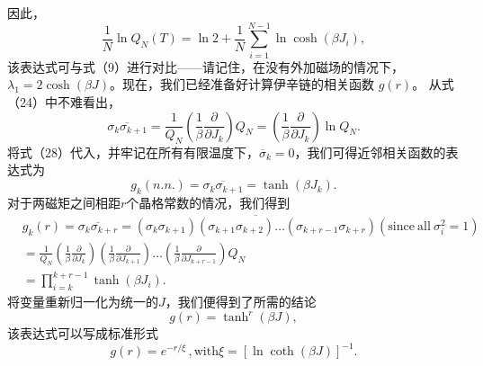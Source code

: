 因此，
\begin{equation}\tag{13.1.42}\label{eq:13.1.42}
\frac { 1 } { N } \ln Q _ { N } ( T ) = \ln 2 + \frac { 1 } { N } \sum _ { i = 1 } ^{N - 1} \ln \cosh ( \beta J _ { i } ) ,
\end{equation}
该表达式可与式（9）进行对比——请记住，在没有外加磁场的情况下，\(\lambda_{1}=2\cosh(\beta J)\)。现在，我们已经准备好计算伊辛链的相关函数 \(g(r)\)。
从式（24）中不难看出，
\begin{equation}\tag{13.1.43}\label{eq:13.1.43}
\overline { { \sigma _ { k } \sigma _ { k + 1 } } } = \frac { 1 } { Q _ { N } } \left( \frac { 1 } { \beta } \frac { \partial } { \partial J _ { k } } \right) Q _ { N } = \left( \frac { 1 } { \beta } \frac { \partial } { \partial J _ { k } } \right) \ln Q _ { N } .
\end{equation}
将式（28）代入，并牢记在所有有限温度下，\(\overline{\sigma}_{k}=0\)，我们可得近邻相关函数的表达式为
\begin{equation}\tag{13.1.44}\label{eq:13.1.44}
g _ { k } ( n . n . ) = \overline { { \sigma _ { k } \sigma _ { k + 1 } } } = \operatorname { t a n h } ( \beta J _ { k } ) .
\end{equation}
对于两磁矩之间相距\(r\)个晶格常数的情况，我们得到
\begin{equation}\tag{13.1.45}\label{eq:13.1.45}
\begin{array}{rl} & { g _ { k } ( r ) = \overline { { \sigma _ { k } \sigma _ { k + r } } } = \overline { { ( \sigma _ { k } \sigma _ { k + 1 } ) ( \sigma _ { k + 1 } \sigma _ { k + 2 } ) \dots ( \sigma _ { k + r - 1 } \sigma _ { k + r } ) } }  ( \mathrm { s i n c e ~ a l l ~ } \sigma _ { i } ^{2} = 1 ) } \\& {  = \frac { 1 } { Q _ { N } } \left( \frac { 1 } { \beta } \frac { \partial } { \partial J _ { k } } \right) \left( \frac { 1 } { \beta } \frac { \partial } { \partial J _ { k + 1 } } \right) \dots \left( \frac { 1 } { \beta } \frac { \partial } { \partial J _ { k + r - 1 } } \right) Q _ { N } } \\& {  = \prod _ { i = k } ^{k + r - 1} \operatorname { t a n h } ( \beta J _ { i } ) . } \end{array}
\end{equation}
将变量重新归一化为统一的\(J\)，我们便得到了所需的结论
\begin{equation}\tag{13.1.46}\label{eq:13.1.46}
g ( r ) = \operatorname { t a n h } ^{r} ( \beta J ) ,
\end{equation}
该表达式可以写成标准形式
\begin{equation}\tag{13.1.47}\label{eq:13.1.47}
g ( r ) = e ^{- r / \xi} \, ,  \mathrm { w i t h }  \xi = \left[ \ln \coth ( \beta J ) \right] ^{- 1} .
\end{equation}
